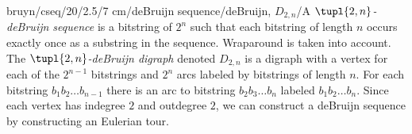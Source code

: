 bruyn/cseq/20/2.5/7 cm/{deBruijn sequence}/{deBruijn, $D_{2,n}$}/{A \emph{$\tupl{2,n}$-deBruijn sequence} is a bitstring of $2^n$ such that each bitstring of length $n$ occurs exactly once as a substring in the sequence. Wraparound is taken into account. The \emph{$\tupl{2,n}$-deBruijn digraph} denoted $D_{2,n}$ is a digraph with a vertex for each of the $2^{n-1}$ bitstrings and $2^n$ arcs labeled by bitstrings of length $n$. For each bitstring $b_1b_2\ldots b_{n-1}$ there is an arc to bitstring $b_2b_3\ldots b_n$ labeled $b_1b_2\ldots b_n$. Since each vertex has indegree $2$ and outdegree $2$, we can construct a deBruijn sequence by constructing an Eulerian tour.}
